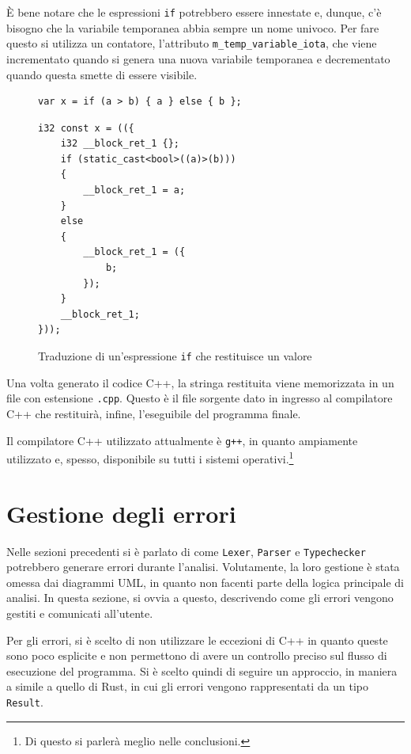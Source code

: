\`E bene notare che le espressioni \texttt{if} potrebbero essere innestate e, dunque, c'\`e bisogno che la variabile temporanea abbia sempre un nome univoco. Per fare questo si utilizza un contatore, l'attributo \texttt{m\_temp\_variable\_iota}, che viene incrementato quando si genera una nuova variabile temporanea e decrementato quando questa smette di essere visibile.

\begin{figure}[H]
	\centering
	\begin{verbatim}
var x = if (a > b) { a } else { b };
	\end{verbatim}
	\begin{verbatim}
i32 const x = (({
    i32 __block_ret_1 {};
    if (static_cast<bool>((a)>(b)))
    {
        __block_ret_1 = a;
    }
    else
    {
        __block_ret_1 = ({
            b;
        });
    }
    __block_ret_1;
}));
	\end{verbatim}
	\label{fig:if-with-value}
	\caption{Traduzione di un'espressione \texttt{if} che restituisce un valore}
\end{figure}

Una volta generato il codice C++, la stringa restituita viene memorizzata in un file con estensione \texttt{.cpp}. Questo \`e il file sorgente dato in ingresso al compilatore C++ che restituir\`a, infine, l'eseguibile del programma finale.

Il compilatore C++ utilizzato attualmente \`e \texttt{g++}, in quanto ampiamente utilizzato e, spesso, disponibile su tutti i sistemi operativi.\footnote{Di questo si parler\`a meglio nelle conclusioni.}

\section{Gestione degli errori}
\label{sec:gestione-degli-errori}

Nelle sezioni precedenti si \`e parlato di come \texttt{Lexer}, \texttt{Parser} e \texttt{Typechecker} potrebbero generare errori durante l'analisi. Volutamente, la loro gestione \`e stata omessa dai diagrammi UML, in quanto non facenti parte della logica principale di analisi. In questa sezione, si ovvia a questo, descrivendo come gli errori vengono gestiti e comunicati all'utente.

Per gli errori, si \`e scelto di non utilizzare le eccezioni di C++ in quanto queste sono poco esplicite e non permettono di avere un controllo preciso sul flusso di esecuzione del programma. Si \`e scelto quindi di seguire un approccio, in maniera a simile a quello di Rust, in cui gli errori vengono rappresentati da un tipo \texttt{Result}.

